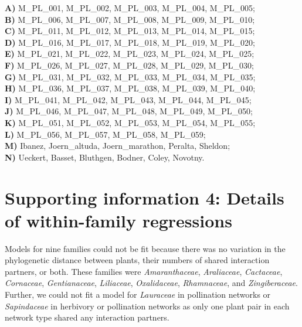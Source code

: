 \documentclass[12pt]{article}
\begin{document}
\begin{spacing}{1.0}
    \noindent \textbf{A)} M\_PL\_001, M\_PL\_002, M\_PL\_003, M\_PL\_004, M\_PL\_005;      \\
    \textbf{B)} M\_PL\_006, M\_PL\_007, M\_PL\_008, M\_PL\_009, M\_PL\_010;    \\
    \textbf{C)} M\_PL\_011, M\_PL\_012, M\_PL\_013, M\_PL\_014, M\_PL\_015;  \\
    \textbf{D)} M\_PL\_016, M\_PL\_017, M\_PL\_018, M\_PL\_019, M\_PL\_020;   \\
    \textbf{E)} M\_PL\_021, M\_PL\_022, M\_PL\_023, M\_PL\_024, M\_PL\_025;  \\
    \textbf{F)} M\_PL\_026, M\_PL\_027, M\_PL\_028, M\_PL\_029, M\_PL\_030;  \\
    \textbf{G)} M\_PL\_031, M\_PL\_032, M\_PL\_033, M\_PL\_034, M\_PL\_035; \\
    \textbf{H)} M\_PL\_036, M\_PL\_037, M\_PL\_038, M\_PL\_039, M\_PL\_040;   \\
    \textbf{I)} M\_PL\_041, M\_PL\_042, M\_PL\_043, M\_PL\_044, M\_PL\_045;\\
    \textbf{J)} M\_PL\_046, M\_PL\_047, M\_PL\_048, M\_PL\_049, M\_PL\_050;  \\
    \textbf{K)} M\_PL\_051, M\_PL\_052, M\_PL\_053, M\_PL\_054, M\_PL\_055;   \\
    \textbf{L)} M\_PL\_056, M\_PL\_057, M\_PL\_058, M\_PL\_059;  \\
    \textbf{M)} Ibanez, Joern\_altuda, Joern\_marathon, Peralta, Sheldon;  \\
    \textbf{N)} Ueckert, Basset, Bluthgen, Bodner, Coley, Novotny.

\clearpage

\section*{Supporting information 4: Details of within-family regressions}

    Models for nine families could not be fit because there was no variation in the phylogenetic distance between plants, their numbers of shared interaction partners, or both. These families were \emph{Amaranthaceae}, \emph{Araliaceae}, \emph{Cactaceae}, \emph{Cornaceae}, \emph{Gentianaceae}, \emph{Liliaceae}, \emph{Oxalidaceae}, \emph{Rhamnaceae}, and \emph{Zingiberaceae}. Further, we could not fit a model for \emph{Lauraceae} in pollination networks or \emph{Sapindaceae} in herbivory or pollination networks as only one plant pair in each network type shared any interaction partners.



\end{spacing}
\end{document}
